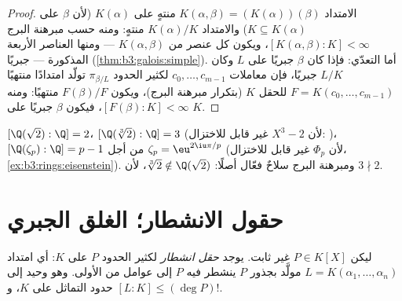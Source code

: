 \begin{proof}
الامتداد $K(\alpha, \beta) = (K(\alpha))(\beta)$ منتهٍ على $K(\alpha)$ (لأن $\beta$  على
$K \subseteq K(\alpha)$) والامتداد $K(\alpha)/K$ منتهٍ: ومنه حسب مبرهنة البرج
$[K(\alpha,\beta):K] <
\infty$، ويكون كل عنصر من $K(\alpha, \beta)$ --- ومنها العناصر الأربعة
المذكورة --- جبريًا (\cref{thm:b3:galois:simple}). أما التعدّي: فإذا كان $\beta$
جبريًا على $L$ وكان $L/K$ جبريًا، فإن معاملات $c_0, \dots, c_{m-1}$ لكثير
الحدود $\pi_{\beta/L}$ تولّد امتدادًا منتهيًا $F = K(c_0, \dots,
c_{m-1})$ للحقل $K$
(بتكرار مبرهنة البرج)، ويكون $F(\beta)/F$ منتهيًا: ومنه $[F(\beta):K] < \infty$،
فيكون $\beta$ جبريًا على $K$.
\end{proof}

\begin{example}\label{ex:b3:galois:degrees}
$[\Q(\sqrt2):\Q] = 2$، $[\Q(\sqrt[3]2):\Q] = 3$ (لأن $X^3 - 2$ غير قابل للاختزال: )،
$[\Q(\zeta_p):\Q] = p - 1$ من أجل $\zeta_p = \eu^{2\iu\pi/p}$ (لأن $\Phi_p$ غير قابل للاختزال،
\cref{ex:b3:rings:eisenstein}). ومبرهنة البرج سلاحٌ فعّال أصلًا: $\sqrt[3]2 \notin \Q(\sqrt2)$، لأن
$3 \nmid 2$.
\end{example}

\section{حقول الانشطار؛ الغلق الجبري}

\begin{theorem}\label{thm:b3:galois:splitting}
ليكن $P \in K[X]$ غير ثابت. يوجد \emph{حقل انشطار} لكثير الحدود $P$ على $K$: أي امتداد $L =
K(\alpha_1, \dots, \alpha_n)$ مولَّد بجذور
$P$ ينشطر فيه $P$ إلى عوامل من  الأولى. وهو وحيد إلى حدود
التماثل على $K$، و $[L:K] \leq (\deg P)!$.
\end{theorem}

